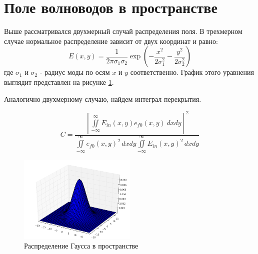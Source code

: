 \section{Поле волноводов в пространстве}

Выше рассматривался двухмерный случай распределения поля. В трехмерном случае нормальное распределение зависит от двух координат и равно:
\begin{equation}
  \label{gauss3d}
  E(x,y)=\frac{1}{2\pi\sigma_1\sigma_2}\exp\left(-\frac{x^2}{2\sigma_1^2}-\frac{y^2}{2\sigma_2^2}\right)
\end{equation}
где $\sigma_1$ и $\sigma_2$ - радиус моды по осям $x$ и $y$ соответственно. График этого уравнения выглядит представлен на рисунке \ref{gauss3dPlot}.

Аналогично двухмерному случаю, найдем интеграл перекрытия.

\begin{equation}
	\label{coupling}
	C = \frac{\left[\iint\limits_{-\infty}^{\infty}E_{in}(x,y)e_{f0}(x,y) \,dxdy\right]^2}
	{\iint\limits_{-\infty}^{\infty}e_{f0}(x,y)^2 \,dxdy
	 \iint\limits_{-\infty}^{\infty}E_{in}(x,y)^2 \,dxdy}
\end{equation}

\begin{figure}[h!]
	\includegraphics[width=0.5\textwidth]{img/gauss3d.png}
	\caption{Распределение Гаусса в пространстве}
	\label{gauss3dPlot}
\end{figure}

